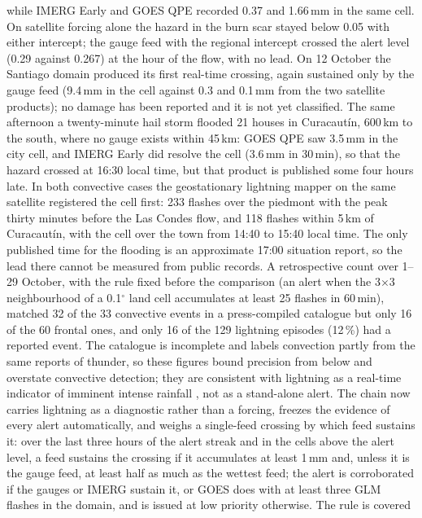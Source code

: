 \documentclass[authoryear,preprint,review,12pt]{elsarticle}
\begin{document}
while IMERG Early and GOES QPE recorded 0.37 and 1.66\,mm in the same cell. On
satellite forcing alone the hazard in the burn scar stayed below 0.05 with either
intercept; the gauge feed with the regional intercept crossed the alert level
(0.29 against 0.267) at the hour of the flow, with no lead. On 12 October the
Santiago domain produced its first real-time crossing, again sustained only by
the gauge feed (9.4\,mm in the cell against 0.3 and 0.1\,mm from the two satellite
products); no damage has been reported and it is not yet classified. The same
afternoon a twenty-minute hail storm flooded 21 houses in Curacaut\'in, 600\,km
to the south, where no gauge exists within 45\,km: GOES QPE saw 3.5\,mm in the
city cell, and IMERG Early did resolve the cell (3.6\,mm in 30\,min), so that the
hazard crossed at 16:30 local time, but that product is published some four
hours late. In both convective cases the geostationary lightning mapper on the
same satellite \citep{goodman2013} registered the cell first: 233 flashes over
the piedmont with the peak thirty minutes before the Las Condes flow, and 118
flashes within 5\,km of Curacaut\'in, with the cell over the town from 14:40 to
15:40 local time. The only published time for the flooding is an approximate
17:00 situation report, so the lead there cannot be measured from public records.
A retrospective count over 1--29 October, with the rule fixed before the comparison
(an alert when the 3$\times$3 neighbourhood of a 0.1$^\circ$ land cell accumulates at
least 25 flashes in 60\,min), matched 32 of the 33 convective events in a
press-compiled catalogue but only 16 of the 60 frontal ones, and only 16 of the 129
lightning episodes (12\,\%) had a reported event. The catalogue is incomplete and
labels convection partly from the same reports of thunder, so these figures bound
precision from below and overstate convective detection; they are consistent with
lightning as a real-time indicator of imminent intense rainfall \citep{price2011},
not as a stand-alone alert. The chain
now carries lightning as a diagnostic rather than a forcing, freezes the evidence of
every alert automatically, and weighs a single-feed crossing by which feed sustains
it: over the last three hours of the alert streak and in the cells above the alert
level, a feed sustains the crossing if it accumulates at least 1\,mm and, unless it
is the gauge feed, at least half as much as the wettest feed; the alert is
corroborated if the gauges or IMERG sustain it, or GOES does with at least three GLM
flashes in the domain, and is issued at low priority otherwise. The rule is covered
\end{document}
